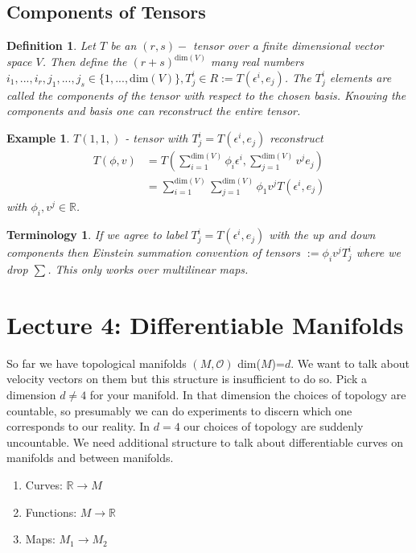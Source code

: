 \documentclass[10pt, oneside]{article}
\newcommand{\R}{\mathbb{R}}
\newtheorem{defn}{Definition}
\newtheorem{example}{Example}
\newtheorem{Terminology}{Terminology}
\begin{document}
     \subsection{Components of Tensors}
        \begin{defn}
           Let $T$ be an $(r,s) - $ tensor over a finite dimensional vector space $V$. Then define the $(r+s)^{\text{dim}(V)}$ many real numbers $i_1,...,i_r, j_1,...,j_s \in \{1,...,\text{dim}(V)\}, T^i_j \in R := T(\epsilon^i,e_j)$. The $T^i_j$ elements are called the components of the tensor with respect to the chosen basis.
           Knowing the components and basis one can reconstruct the entire tensor.
        \end{defn}
        \begin{example}
           $T (1,1,)$ - tensor with $T^i_j = T(\epsilon^i,e_j)$ reconstruct
           \begin{align*}
              T(\phi,v) &= T(\sum_{i=1}^{\text{dim}(V)}\phi_i \epsilon^i, \sum_{j=1}^{\text{dim}(V)}v^j e_j) \\
              &=\sum_{i=1}^{\text{dim}(V)}\sum_{j=1}^{\text{dim}(V)} \phi_1 v^j T(\epsilon^i,e_j)
           \end{align*}
           with $\phi_i, v^j \in \R$.
        \end{example}
        \begin{Terminology}
           If we agree to label $T^i_j = T(\epsilon^i,e_j)$ with the up and down components then Einstein summation convention of tensors $:= \phi_i v^j T^i_j$ where we drop $\sum$. This only works over multilinear maps.
        \end{Terminology}
\section{Lecture 4: Differentiable Manifolds \cite{DiffM}}
  So far we have topological manifolds $(M,\mathcal{O})$ dim($M$)=$d$. We want to talk about velocity vectors on them but this structure is insufficient to do so.
  Pick a dimension $d \neq 4$ for your manifold. In that dimension the choices of topology are countable, so presumably we can do experiments to discern which one corresponds to our reality.
  In $d=4$ our choices of topology are suddenly uncountable. We need additional structure to talk about differentiable curves on manifolds and between manifolds.
  \begin{enumerate}
     \item Curves: $\R \to M$
     \item Functions: $M \to \R$
     \item Maps: $M_1 \to M_2$
  \end{enumerate}
\end{document}
